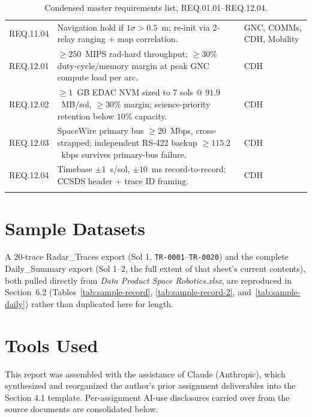 \documentclass[11pt]{article}
\begin{document}
\begin{appendices}
\begin{longtable}{p{1.6cm}p{8.6cm}p{3cm}}
REQ.11.04 & Navigation hold if $1\sigma > 0.5$~m; re-init via 2-relay ranging + map
correlation. & GNC, COMMs, CDH, Mobility \\
REQ.12.01 & $\geq 250$~MIPS rad-hard throughput; $\geq 30\%$ duty-cycle/memory margin at
peak GNC compute load per arc. & CDH \\
REQ.12.02 & $\geq 1$~GB EDAC NVM sized to 7 sols @ $91.9$~MB/sol, $\geq 30\%$ margin;
science-priority retention below $10\%$ capacity. & CDH \\
REQ.12.03 & SpaceWire primary bus $\geq 20$~Mbps, cross-strapped; independent RS-422
backup $\geq 115.2$~kbps survives primary-bus failure. & CDH \\
REQ.12.04 & Timebase $\pm 1$~s/sol, $\pm 10$~ms record-to-record; CCSDS header + trace ID
framing. & CDH \\
\bottomrule
\caption{Condensed master requirements list, REQ.01.01--REQ.12.04.}
\label{tab:master-reqs}
\end{longtable}

\section{Sample Datasets}
A 20-trace Radar\_Traces export (Sol 1, \texttt{TR-0001}--\texttt{TR-0020}) and the complete
Daily\_Summary export (Sol 1--2, the full extent of that sheet's current contents), both pulled
directly from \textit{Data Product Space Robotics.xlsx}, are reproduced in
Section~6.2 (Tables~\ref{tab:sample-record}, \ref{tab:sample-record-2},
and~\ref{tab:sample-daily}) rather than duplicated here for length.

\section{Tools Used}
This report was assembled with the assistance of Claude (Anthropic), which synthesized and
reorganized the author's prior assignment deliverables into the Section 4.1 template. Per-assignment
AI-use disclosures carried over from the source documents are consolidated below.


\end{appendices}
\end{document}
